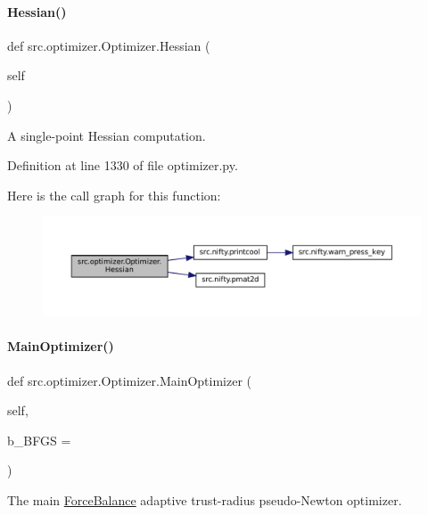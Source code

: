 \paragraph{\texorpdfstring{Hessian()}{Hessian()}}
{\footnotesize\ttfamily def src.\+optimizer.\+Optimizer.\+Hessian (\begin{DoxyParamCaption}\item[{}]{self }\end{DoxyParamCaption})}



A single-\/point Hessian computation. 



Definition at line 1330 of file optimizer.\+py.

Here is the call graph for this function\+:
\nopagebreak
\begin{figure}[H]
\begin{center}
\leavevmode
\includegraphics[width=350pt]{classsrc_1_1optimizer_1_1Optimizer_ac844fd676b7e9d08c0c9bca811838c3a_cgraph}
\end{center}
\end{figure}
\mbox{\label{classsrc_1_1optimizer_1_1Optimizer_a30443d919712b0f3529de3c7d62619ca}} 
\paragraph{\texorpdfstring{Main\+Optimizer()}{MainOptimizer()}}
{\footnotesize\ttfamily def src.\+optimizer.\+Optimizer.\+Main\+Optimizer (\begin{DoxyParamCaption}\item[{}]{self,  }\item[{}]{b\+\_\+\+B\+F\+GS = {} }\end{DoxyParamCaption})}



The main \hyperlink{namespaceForceBalance}{Force\+Balance} adaptive trust-\/radius pseudo-\/\+Newton optimizer. 

